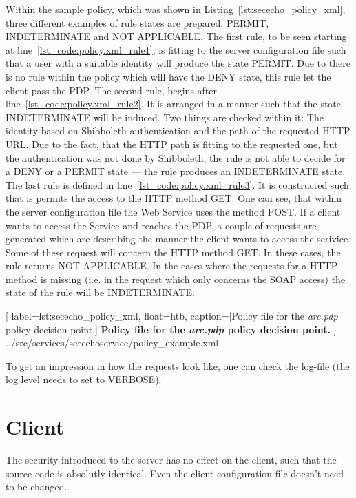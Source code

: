 Within the sample policy, which was shown in Listing~\ref{lst:sececho_policy_xml}, three different examples of rule states are prepared: PERMIT, INDETERMINATE and NOT APPLICABLE.
The first rule, to be seen starting at line~\ref{lst_code:policy.xml_rule1}, is fitting to the server configuration file such that a user with a suitable identity will produce the state PERMIT. 
Due to there is no rule within the policy which will have the DENY state, this rule let the client pass the PDP.
The second rule, begins after line~\ref{lst_code:policy.xml_rule2}. It is arranged in a manner such that the state INDETERMINATE will be induced. Two things are checked within it: The identity based on Shibboleth authentication and the path of the requested HTTP URL. Due to the fact, that the HTTP path is fitting to the requested one, but the authentication was not done by Shibboleth, the rule is not able to decide for a DENY or a PERMIT state --- the rule produces an INDETERMINATE state.
The last rule is defined in line~\ref{lst_code:policy.xml_rule3}. It is constructed such that is permits the access to the HTTP method GET. 
One can see, that within the server configuration file the Web Service uses the method POST. If a client wants to access the Service and reaches the PDP, a couple of requests are generated which are describing the manner the client wants to access the serivice. Some of these request will concern the HTTP method GET. In these cases, the rule returns NOT APPLICABLE. In the cases where the requests for a HTTP method is missing (i.e. in the request which only concerns the SOAP access) the state of the rule will be INDETERMINATE.\\

	[
	label=lst:sececho_policy_xml, float=htb,
	caption={[Policy file for the \textit{arc.pdp} policy decision point.]
	\textbf{Policy file for the \textit{arc.pdp} policy decision point.}}
	]
{../src/services/secechoservice/policy_example.xml}


To get an impression in how the requests look like, one can check the log-file (the log level needs to set to VERBOSE).


\section{Client}

The security introduced to the server has no effect on the client, such that the source code is absolutly identical. Even the client configuration file doesn't need to be changed.
















